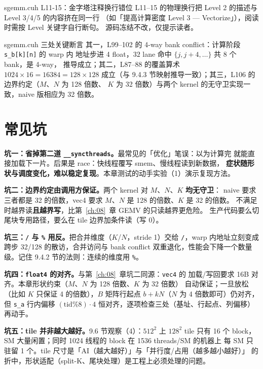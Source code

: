 \begin{kaogu}[F5 排版]{sgemm.cuh L11-15：金字塔注释换行错位}
  L11--15 的物理换行把 Level 2 的描述与 Level 3/4/5 的内容挤在同一行
  （如「提高计算密度 Level 3 — Vectorize」），阅读时需按 Level 关键字自行断句。
  源码冻结不改，仅提示读者。
\end{kaogu}

\begin{kaogu}[核校通过]{sgemm.cuh 三处关键断言}
  其一，L99--102 的 4-way bank conflict：计算阶段 \texttt{s\_b[k][n]} 的 warp 内
  地址步进 4 float，$32$ lane 命中 $\{j, j{+}4, \dots\}$ 共 8 个 bank，是 4-way，
  推导成立；其二，L87--88 的覆盖算术 $1024 \times 16 = 16384 = 128 \times 128$
  成立（与 9.4.3 节映射推导一致）；其三，L106 的边界约定（$M$、$N$ 为 128 倍数、
  $K$ 为 32 倍数）与两个 kernel 的无守卫实现一致，naive 版相应为 32 倍数。
\end{kaogu}

\section{常见坑}

\textbf{坑一：省掉第二道 \texttt{\_\allowbreak{}\_\allowbreak{}syncthreads}。}最常见的「优化」笔误：以为计算完
就能直接加载下一片。后果是 race：快线程覆写 smem、慢线程读到新数据，
\textbf{症状随形状与调度变化，难以稳定复现}。本章测试的动手实验（1）演示复现方法。

\textbf{坑二：边界约定由调用方保证。}两个 kernel 对 $M$、$N$、$K$ \textbf{均无守卫}：
naive 要求三者都是 32 的倍数，vec4 要求 $M$、$N$ 是 128 的倍数、$K$ 是 32 的倍数。
不满足时越界读\textbf{且越界写}，比第~\ref{ch:08}~章 GEMV 的只读越界更危险。
生产代码要么切尾块专用路径，要么在 tile 边界加条件读（写 0）。

\textbf{坑三：\texttt{/} 与 \texttt{\%} 用反。}把合并维度（$K$/$N$，stride 1）交给
\texttt{/}，warp 内地址立刻变成跨步 32/128 的散访，合并访问与 bank conflict
双重退化，性能会下降一个数量级。记住 9.4.2 节的法则：连续的维度用 \texttt{\%}。

\textbf{坑四：\texttt{float4} 的对齐。}与第~\ref{ch:08}~章坑二同源：\texttt{vec4} 的
加载/写回要求 16B 对齐。本章形状约束（$M$、$N$ 为 128 倍数、$K$ 为 32 倍数）
自动保证；一旦放松（比如 $K$ 只保证 4 的倍数），$B$ 矩阵行起点
$b + kN$（$N$ 为 4 倍数即可）仍对齐，但 \texttt{s\_a} 行内偏移 $(\mathrm{tid}\%8)\cdot4$
恒对齐，逐项检查三处（基址、行起点、列偏移）再动手。

\textbf{坑五：tile 并非越大越好。}\allowbreak{}9.6 节观察（4）：$512^2$ 上 $128^2$ tile 只有
16 个 block，SM 大量闲置；同时 1024 线程的 block 在 1536 threads/SM 的机器上
每 SM 只驻留 1 个。tile 尺寸是「AI（越大越好）」与「并行度/占用（越多越小越好）」
的折中，形状适配（split-K、尾块处理）是工程上必须处理的问题。

